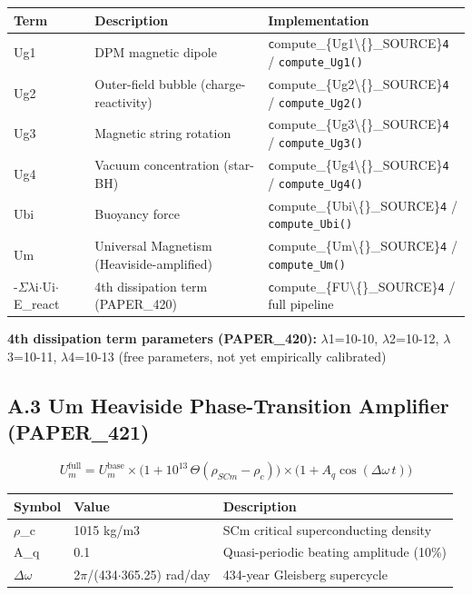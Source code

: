 \documentclass[11pt]{article}
\begin{document}
\begin{center}
\begin{longtable}{lll}
\toprule
Term & Description & Implementation \tabularnewline
\midrule
\endhead
Ug1 & DPM magnetic dipole & \verb|c|ompute\_\{Ug1\textbackslash\{\}\_SOURCE\}\verb|4| / \verb|compute_Ug1()| \tabularnewline
Ug2 & Outer-field bubble (charge-reactivity) & \verb|c|ompute\_\{Ug2\textbackslash\{\}\_SOURCE\}\verb|4| / \verb|compute_Ug2()| \tabularnewline
Ug3 & Magnetic string rotation & \verb|c|ompute\_\{Ug3\textbackslash\{\}\_SOURCE\}\verb|4| / \verb|compute_Ug3()| \tabularnewline
Ug4 & Vacuum concentration (star-BH) & \verb|c|ompute\_\{Ug4\textbackslash\{\}\_SOURCE\}\verb|4| / \verb|compute_Ug4()| \tabularnewline
Ubi & Buoyancy force & \verb|c|ompute\_\{Ubi\textbackslash\{\}\_SOURCE\}\verb|4| / \verb|compute_Ubi()| \tabularnewline
Um & Universal Magnetism (Heaviside-amplified) & \verb|c|ompute\_\{Um\textbackslash\{\}\_SOURCE\}\verb|4| / \verb|compute_Um()| \tabularnewline
-$\Sigma$$\lambda$i$\cdot$Ui$\cdot$E\_react & 4th dissipation term (PAPER\_420) & \verb|c|ompute\_\{FU\textbackslash\{\}\_SOURCE\}\verb|4| / full pipeline \tabularnewline
\bottomrule
\end{longtable}
\end{center}

\textbf{4th dissipation term parameters (PAPER\_420):} $\lambda$1=10-10, $\lambda$2=10-12, $\lambda$3=10-11, $\lambda$4=10-13 (free parameters, not yet empirically calibrated)

\subsection*{A.3 Um Heaviside Phase-Transition Amplifier (PAPER\_421)}

$$U_m^{\mathrm{full}} = U_m^{\mathrm{base}} \times \bigl(1 + 10^{13}\,\Theta(\rho_{SCm} - \rho_c)\bigr) \times \bigl(1 + A_q\cos(\Delta\omega\,t)\bigr)$$

\begin{center}
\begin{longtable}{lll}
\toprule
Symbol & Value & Description \tabularnewline
\midrule
\endhead
$\rho$\_c & 1015 kg/m3 & SCm critical superconducting density \tabularnewline
A\_q & 0.1 & Quasi-periodic beating amplitude (10\%) \tabularnewline
$\Delta$$\omega$ & 2$\pi$/(434$\cdot$365.25) rad/day & 434-year Gleisberg supercycle \tabularnewline
\bottomrule
\end{longtable}
\end{center}
\end{document}
